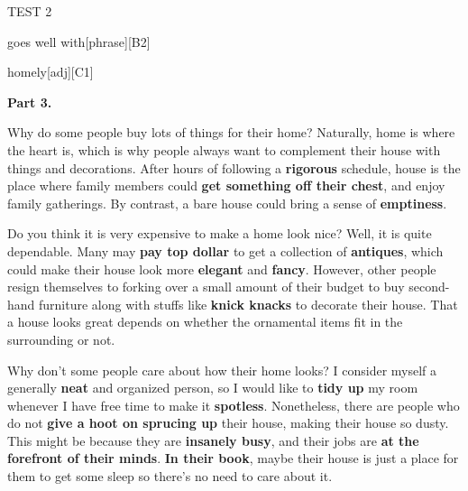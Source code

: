 \begin{glossarymc}[Cambridge 14]
\begin{test}{TEST 2}
\begin{VocabExplain}[Part 2]
            \begin{ExplainCard}{goes well with}[phrase][B2]
            \end{ExplainCard}

            \begin{ExplainCard}{homely}[adj][C1]
            \end{ExplainCard}
        \end{VocabExplain}

    \noindent
    \textbf{Part 3.}
    \begin{qa}{Why do some people buy lots of things for their home?}
    Naturally, home is where the heart is, which is why people always want to complement their house with things and decorations. After hours of following a \textbf{rigorous} schedule, house is the place where family members could \textbf{get something off their chest}, and enjoy family gatherings. By contrast, a bare house could bring a sense of \textbf{emptiness}.
    \end{qa}

    \begin{qa}{Do you think it is very expensive to make a home look nice?}
    Well, it is quite dependable. Many may \textbf{pay top dollar} to get a collection of \textbf{antiques}, which could make their house look more \textbf{elegant} and \textbf{fancy}. However, other people resign themselves to forking over a small amount of their budget to buy second-hand furniture along with stuffs like \textbf{knick knacks} to decorate their house. That a house looks great depends on whether the ornamental items fit in the surrounding or not.
    \end{qa}

    \begin{qa}{Why don’t some people care about how their home looks?}
    I consider myself a generally \textbf{neat} and organized person, so I would like to \textbf{tidy up} my room whenever I have free time to make it \textbf{spotless}. Nonetheless, there are people who do not \textbf{give a hoot on sprucing up} their house, making their house so dusty. This might be because they are \textbf{insanely busy}, and their jobs are \textbf{at the forefront of their minds}. \textbf{In their book}, maybe their house is just a place for them to get some sleep so there’s no need to care about it.
    \end{qa}


\end{test}
\end{glossarymc}
